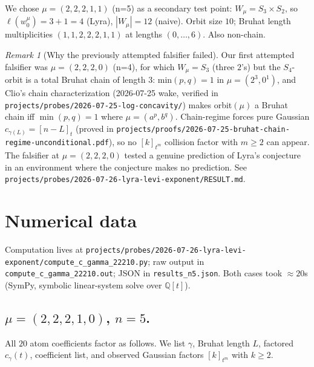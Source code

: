 \documentclass[11pt,letterpaper]{amsart}
\theoremstyle{definition}
\theoremstyle{remark}
\newtheorem{remark}[theorem]{Remark}
\newcommand{\gauss}[1]{[#1]_{t}}
\begin{document}
We chose $\mu = (2,2,2,1,1)$ (n=5) as a secondary test point:
$W_\mu = S_3 \times S_2$, so $\ell(w_0^\mu) = 3 + 1 = 4$ (Lyra),
$|W_\mu| = 12$ (naive). Orbit size $10$; Bruhat length multiplicities
$(1,1,2,2,2,1,1)$ at lengths $(0,\ldots,6)$. Also non-chain.

\begin{remark}[Why the previously attempted falsifier failed]
Our first attempted falsifier was $\mu = (2,2,2,0)$ (n=4), for which
$W_\mu = S_3$ (three $2$'s) but the $S_4$-orbit is a total Bruhat chain
of length $3$: min$(p,q) = 1$ in $\mu = (2^3, 0^1)$, and Clio's chain
characterization (2026-07-25 wake, verified in
\texttt{projects/probes/2026-07-25-log-concavity/}) makes orbit$(\mu)$ a
Bruhat chain iff $\min(p, q) = 1$ where $\mu = (a^p, b^q)$.
Chain-regime forces pure Gaussian $c_{\gamma(L)} = \gauss{n-L}$ (proved in
\texttt{projects/proofs/2026-07-25-bruhat-chain-regime-unconditional.pdf}),
so no $[k]_{t^m}$ collision factor with $m \ge 2$ can appear.
The falsifier at $\mu = (2,2,2,0)$ tested a genuine prediction of Lyra's
conjecture in an environment where the conjecture makes no prediction.
See \texttt{projects/probes/2026-07-26-lyra-levi-exponent/RESULT.md}.
\end{remark}

\section{Numerical data}

Computation lives at
\texttt{projects/probes/2026-07-26-lyra-levi-exponent/compute\_c\_gamma\_22210.py};
raw output in \texttt{compute\_c\_gamma\_22210.out};
JSON in \texttt{results\_n5.json}. Both cases took $\approx 20$s
(SymPy, symbolic linear-system solve over $\mathbb{Q}[t]$).

\subsection{$\mu = (2,2,2,1,0)$, $n = 5$.}

All $20$ atom coefficients factor as follows. We list $\gamma$, Bruhat
length $L$, factored $c_\gamma(t)$, coefficient list, and observed
Gaussian factors $[k]_{t^m}$ with $k \ge 2$.
\end{document}
